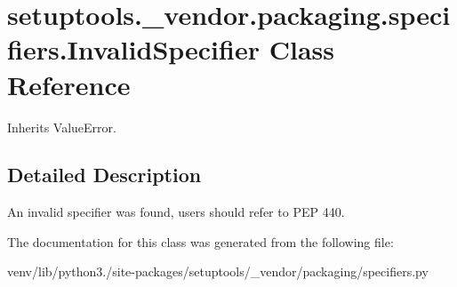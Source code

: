 \hypertarget{classsetuptools_1_1__vendor_1_1packaging_1_1specifiers_1_1_invalid_specifier}{}\section{setuptools.\+\_\+vendor.\+packaging.\+specifiers.\+Invalid\+Specifier Class Reference}
\label{classsetuptools_1_1__vendor_1_1packaging_1_1specifiers_1_1_invalid_specifier}


Inherits Value\+Error.



\subsection{Detailed Description}
\begin{DoxyVerb}An invalid specifier was found, users should refer to PEP 440.
\end{DoxyVerb}
 

The documentation for this class was generated from the following file\+:\begin{DoxyCompactItemize}
\item 
venv/lib/python3./site-\/packages/setuptools/\+\_\+vendor/packaging/specifiers.\+py\end{DoxyCompactItemize}

